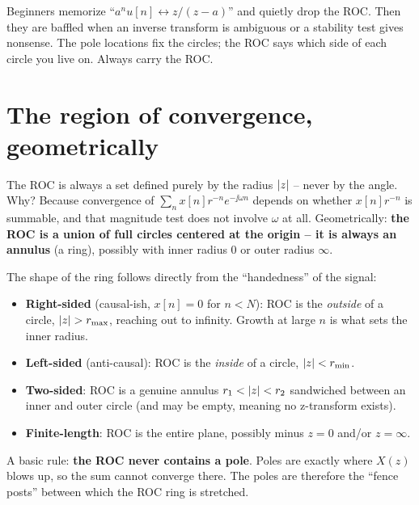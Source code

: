 \begin{trapbox}
Beginners memorize ``$a^n u[n] \leftrightarrow z/(z-a)$'' and quietly drop the ROC. Then
they are baffled when an inverse transform is ambiguous or a stability test gives
nonsense. The pole locations fix the circles; the ROC says which side of each circle you
live on. Always carry the ROC.
\end{trapbox}

\section{The region of convergence, geometrically}
\label{ch15:roc}

The ROC is always a set defined purely by the radius $\lvert z\rvert$ -- never by the angle.
Why? Because convergence of $\sum_n x[n] r^{-n} e^{-\jj\omega n}$ depends on whether
$x[n]r^{-n}$ is summable, and that magnitude test does not involve $\omega$ at all.
Geometrically: \textbf{the ROC is a union of full circles centered at the origin -- it is
always an annulus} (a ring), possibly with inner radius $0$ or outer radius $\infty$.

The shape of the ring follows directly from the ``handedness'' of the signal:

\begin{itemize}
\item \textbf{Right-sided} (causal-ish, $x[n]=0$ for $n<N$): ROC is the \emph{outside} of
a circle, $\lvert z\rvert > r_{\max}$, reaching out to infinity. Growth at large $n$ is what
sets the inner radius.
\item \textbf{Left-sided} (anti-causal): ROC is the \emph{inside} of a circle,
$\lvert z\rvert < r_{\min}$.
\item \textbf{Two-sided}: ROC is a genuine annulus $r_1 < \lvert z\rvert < r_2$ sandwiched
between an inner and outer circle (and may be empty, meaning no z-transform exists).
\item \textbf{Finite-length}: ROC is the entire plane, possibly minus $z=0$ and/or
$z=\infty$.
\end{itemize}

A basic rule: \textbf{the ROC never contains a pole}. Poles are exactly where $X(z)$
blows up, so the sum cannot converge there. The poles are therefore the ``fence posts''
between which the ROC ring is stretched.

